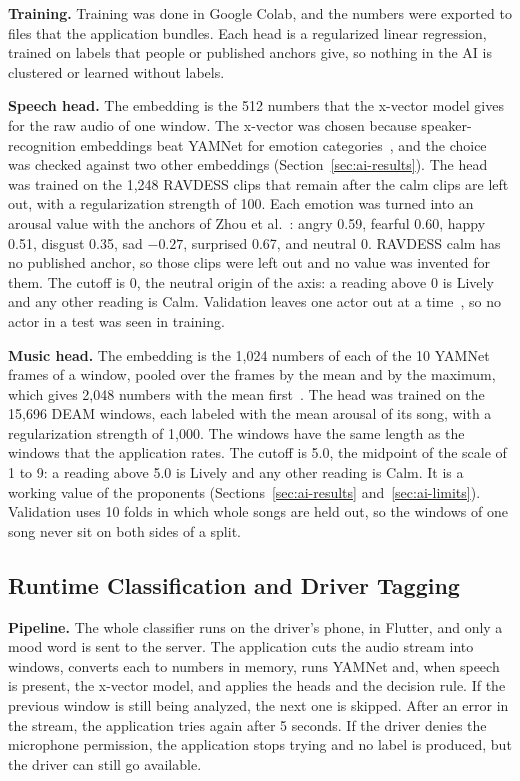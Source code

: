 \textbf{Training.} Training was done in Google Colab, and the numbers were exported to files that the application bundles. Each head is a regularized linear regression, trained on labels that people or published anchors give, so nothing in the AI is clustered or learned without labels.

\textbf{Speech head.} The embedding is the 512 numbers that the x-vector model gives for the raw audio of one window. The x-vector was chosen because speaker-recognition embeddings beat YAMNet for emotion categories~\cite{phukan2023embeddings}, and the choice was checked against two other embeddings (Section~\ref{sec:ai-results}). The head was trained on the 1,248 RAVDESS clips that remain after the calm clips are left out, with a regularization strength of 100. Each emotion was turned into an arousal value with the anchors of Zhou et al.~\cite{zhou2023arousal}: angry 0.59, fearful 0.60, happy 0.51, disgust 0.35, sad $-0.27$, surprised 0.67, and neutral 0. RAVDESS calm has no published anchor, so those clips were left out and no value was invented for them. The cutoff is 0, the neutral origin of the axis: a reading above 0 is Lively and any other reading is Calm. Validation leaves one actor out at a time~\cite{antoniou2023speech}, so no actor in a test was seen in training.

\textbf{Music head.} The embedding is the 1,024 numbers of each of the 10 YAMNet frames of a window, pooled over the frames by the mean and by the maximum, which gives 2,048 numbers with the mean first~\cite{koh2021embeddings}. The head was trained on the 15,696 DEAM windows, each labeled with the mean arousal of its song, with a regularization strength of 1,000. The windows have the same length as the windows that the application rates. The cutoff is 5.0, the midpoint of the scale of 1 to 9: a reading above 5.0 is Lively and any other reading is Calm. It is a working value of the proponents (Sections~\ref{sec:ai-results} and~\ref{sec:ai-limits}). Validation uses 10 folds in which whole songs are held out, so the windows of one song never sit on both sides of a split.

\subsection{Runtime Classification and Driver Tagging}
\label{sec:ai-runtime}
\textbf{Pipeline.} The whole classifier runs on the driver's phone, in Flutter, and only a mood word is sent to the server. The application cuts the audio stream into windows, converts each to numbers in memory, runs YAMNet and, when speech is present, the x-vector model, and applies the heads and the decision rule. If the previous window is still being analyzed, the next one is skipped. After an error in the stream, the application tries again after 5 seconds. If the driver denies the microphone permission, the application stops trying and no label is produced, but the driver can still go available.

